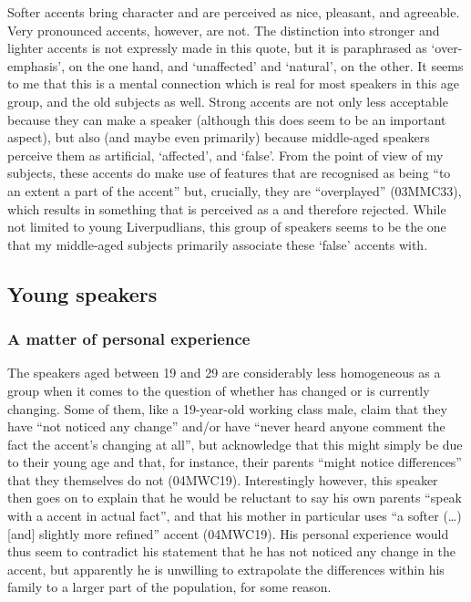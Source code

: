 Softer accents bring character and are perceived as nice, pleasant, and agreeable.
Very pronounced accents, however, are not.
The distinction into stronger and lighter accents is not expressly made in this quote, but it is paraphrased as `over-emphasis', on the one hand, and `unaffected' and `natural', on the other.
It seems to me that this is a mental connection which is real for most speakers in this age group, and the old subjects as well.
Strong  accents are not only less acceptable because they can make a speaker  (although this does seem to be an important aspect), but also (and maybe even primarily) because middle-aged speakers perceive them as artificial, `affected', and `false'.
From the point of view of my subjects, these accents do make use of features that are recognised as being ``to an extent a part of the accent'' but, crucially, they  are ``overplayed'' (03MMC33), which results in something that is perceived as a   and therefore rejected.
While not limited to young Liverpudlians, this group of speakers seems to be the one that my middle-aged subjects primarily associate these `false' accents with.

\subsection{Young speakers}

\subsubsection{A matter of personal experience}
\label{aware_res.eval.young.change}

The speakers aged between 19 and 29 are considerably less homogeneous as a group when it comes to the question of whether  has changed or is currently changing.
Some of them, like a 19-year-old working class male, claim that they have ``not noticed any change'' and/or have ``never heard anyone comment the fact the accent's changing at all'', but acknowledge that this might simply be due to their young age and that, for instance, their parents ``might notice differences'' that they themselves do not (04MWC19).
Interestingly however, this speaker then goes on to explain that he would be reluctant to say his own parents ``speak with a  accent in actual fact'', and that his mother in particular uses ``a softer (\ldots) [and] slightly more refined'' accent (04MWC19).
His personal experience would thus seem to contradict his statement that he has not noticed any change in the accent, but apparently he is unwilling to extrapolate the differences within his family to a larger part of the population, for some reason.

